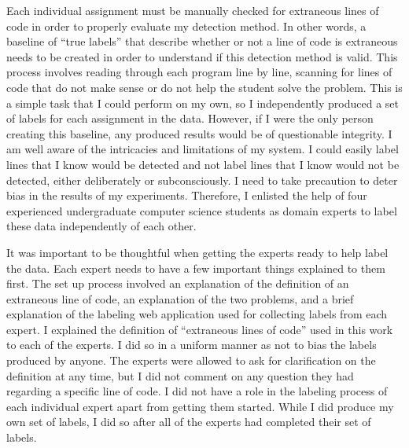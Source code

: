 \documentclass[draft]{article}
\begin{document}
Each individual assignment must be manually checked for extraneous lines of code in order to properly evaluate my detection method. In other words, a baseline of ``true labels'' that describe whether or not a line of code is extraneous needs to be created in order to understand if this detection method is valid. This process involves reading through each program line by line, scanning for lines of code that do not make sense or do not help the student solve the problem. This is a simple task that I could perform on my own, so I independently produced a set of labels for each assignment in the data. However, if I were the only person creating this baseline, any produced results would be of questionable integrity. I am well aware of the intricacies and limitations of my system. I could easily label lines that I know would be detected and not label lines that I know would not be detected, either deliberately or subconsciously. I need to take precaution to deter bias in the results of my experiments. Therefore, I enlisted the help of four experienced undergraduate computer science students as domain experts to label these data independently of each other. 

It was important to be thoughtful when getting the experts ready to help label the data. Each expert needs to have a few important things explained to them first. The set up process involved an explanation of the definition of an extraneous line of code, an explanation of the two problems, and a brief explanation of the labeling web application used for collecting labels from each expert. I explained the definition of ``extraneous lines of code'' used in this work to each of the experts. I did so in a uniform manner as not to bias the labels produced by anyone. The experts were allowed to ask for clarification on the definition at any time, but I did not comment on any question they had regarding a specific line of code. I did not have a role in the labeling process of each individual expert apart from getting them started. While I did produce my own set of labels, I did so after all of the experts had completed their set of labels.


\end{document}
